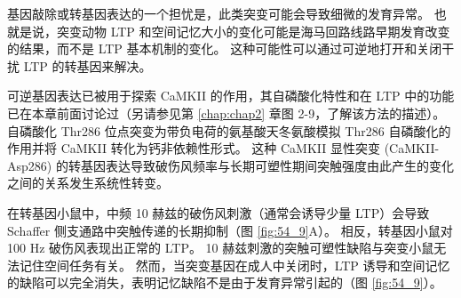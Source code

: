 基因敲除或转基因表达的一个担忧是，此类突变可能会导致细微的发育异常。
也就是说，突变动物 LTP 和空间记忆大小的变化可能是海马回路线路早期发育改变的结果，而不是 LTP 基本机制的变化。
这种可能性可以通过可逆地打开和关闭干扰 LTP 的转基因来解决。


可逆基因表达已被用于探索 CaMKII 的作用，其自磷酸化特性和在 LTP 中的功能已在本章前面讨论过（另请参见第 \ref{chap:chap2} 章图 2-9，了解该方法的描述）。
自磷酸化 Thr286 位点突变为带负电荷的氨基酸天冬氨酸模拟 Thr286 自磷酸化的作用并将 CaMKII 转化为钙非依赖性形式。
这种 CaMKII 显性突变 (CaMKII-Asp286) 的转基因表达导致破伤风频率与长期可塑性期间突触强度由此产生的变化之间的关系发生系统性转变。


在转基因小鼠中，中频 10 赫兹的破伤风刺激（通常会诱导少量 LTP）会导致 Schaffer 侧支通路中突触传递的长期抑制（图 \ref{fig:54_9}A）。
相反，转基因小鼠对 100 Hz 破伤风表现出正常的 LTP。 10 赫兹刺激的突触可塑性缺陷与突变小鼠无法记住空间任务有关。
然而，当突变基因在成人中关闭时，LTP 诱导和空间记忆的缺陷可以完全消失，表明记忆缺陷不是由于发育异常引起的（图 \ref{fig:54_9}）。


